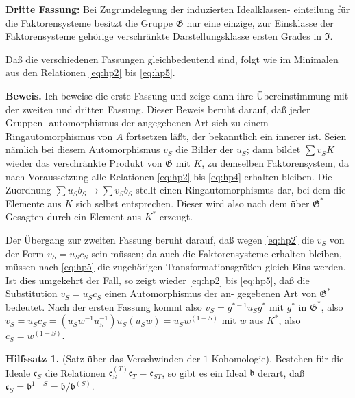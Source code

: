 \documentclass[12pt,a4paper]{article}
\theoremstyle{plain}
\newcommand{\Ga}{\mathfrak{G}}
\begin{document}
\smallskip
\noindent\textbf{Dritte Fassung:}\hspace{0.5em}%
Bei Zugrundelegung der induzierten Idealklassen-
einteilung f\"ur die Faktorensysteme besitzt die Gruppe $\Ga$ nur eine einzige,
zur Einsklasse der Faktorensysteme geh\"orige verschr\"ankte Darstellungsklasse
ersten Grades in $\overline{\mathfrak{I}}$.

Da\ss{} die verschiedenen Fassungen gleichbedeutend sind, folgt wie
im Minimalen aus den Relationen \eqref{eq:hp2} bis \eqref{eq:hp5}.

\medskip
\noindent\textbf{Beweis.}\hspace{0.5em}%
Ich beweise die erste Fassung und zeige dann ihre \"Ubereinstimmung mit der
zweiten und dritten Fassung. Dieser Beweis beruht darauf, da\ss{} jeder Gruppen-
automorphismus der angegebenen Art sich zu einem Ringautomorphismus
von $A$ fortsetzen l\"a\ss t, der bekanntlich ein innerer ist. Seien n\"amlich bei
diesem Automorphismus $v_S$ die Bilder der $u_S$; dann bildet $\sum v_S K$ wieder
das verschr\"ankte Produkt von $\Ga$ mit $K$, zu demselben Faktorensystem,
da nach Voraussetzung alle Relationen \eqref{eq:hp2} bis \eqref{eq:hp4} erhalten bleiben. Die
Zuordnung $\sum u_S b_S \mapsto \sum v_S b_S$ stellt einen Ringautomorphismus dar, bei dem
die Elemente aus $K$ sich selbst entsprechen. Dieser wird also nach dem
\"uber $\Ga^*$ Gesagten durch ein Element aus $K^*$ erzeugt.

Der \"Ubergang zur zweiten Fassung beruht darauf, da\ss{} wegen \eqref{eq:hp2} die $v_S$
von der Form $v_S = u_S c_S$ sein m\"ussen; da auch die Faktorensysteme
erhalten bleiben, m\"ussen nach \eqref{eq:hp5} die zugeh\"origen Transformationsgr\"o\ss en
gleich Eins werden. Ist dies umgekehrt der Fall, so zeigt wieder \eqref{eq:hp2}
bis \eqref{eq:hp5}, da\ss{} die Substitution $v_S = u_S c_S$ einen Automorphismus der an-
gegebenen Art von $\Ga^*$ bedeutet. Nach der ersten Fassung kommt also
$v_S = g^{*-1} u_S g^*$ mit $g^*$ in $\Ga^*$, also $v_S = u_S c_S = (u_S w^{-1} u_S^{-1}) u_S (u_S w) = u_S w^{(1-S)}$
mit $w$ aus $K^*$, also $c_S = w^{(1-S)}$.

\medskip
\noindent\textbf{Hilfssatz 1.}\hspace{0.5em}%
(Satz \"uber das Verschwinden der $1$-Kohomologie).
Bestehen f\"ur die Ideale $\mathfrak{c}_S$ die Relationen $\mathfrak{c}_S^{(T)} \mathfrak{c}_T = \mathfrak{c}_{ST}$, so gibt es ein
Ideal $\mathfrak{b}$ derart, da\ss{} $\mathfrak{c}_S = \mathfrak{b}^{1-S} = \mathfrak{b}/\mathfrak{b}^{(S)}$.
\end{document}
